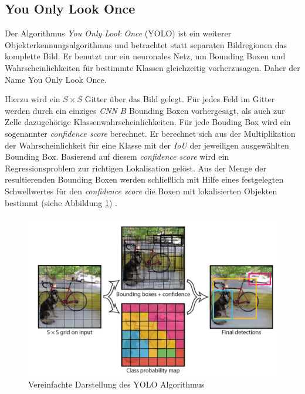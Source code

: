 \subsection*{You Only Look Once}

Der Algorithmus \textit{You Only Look Once} (YOLO) ist ein weiterer Objekterkennungsalgorithmus und betrachtet statt separaten Bildregionen das komplette Bild. Er benutzt nur ein neuronales Netz, um Bounding Boxen und Wahrscheinlichkeiten für bestimmte Klassen gleichzeitig vorherzusagen. Daher der Name \glqq You Only Look Once\grqq{}.

Hierzu wird ein $S \times S$ Gitter über das Bild gelegt. Für jedes Feld im Gitter werden durch ein einziges \textit{CNN} $B$ Bounding Boxen vorhergesagt, als auch zur Zelle dazugehörige Klassenwahrscheinlichkeiten. Für jede Bouding Box wird ein sogenannter \textit{confidence score} berechnet. Er berechnet sich aus der Multiplikation der Wahrscheinlichkeit für eine Klasse mit der \textit{IoU} der jeweiligen ausgewählten Bounding Box. Basierend auf diesem \textit{confidence score} wird ein Regressionsproblem zur richtigen Lokalisation gelöst. Aus der Menge der resultierenden Bounding Boxen werden schließlich mit Hilfe eines festgelegten Schwellwertes für den \textit{confidence score} die Boxen mit lokalisierten Objekten bestimmt (siehe Abbildung \ref{yolo_model}) \cite{JosephRedmon.2016}.

\begin{figure}[ht]
	\begin{center}
		\includegraphics[width=15cm]{Bilder/yolo_model.png} 
		\caption[Vereinfachte Darstellung des YOLO Algorithmus]{Vereinfachte Darstellung des YOLO Algorithmus \cite{JosephRedmon.2016}}
		\label{yolo_model}
	\end{center}
\end{figure}

